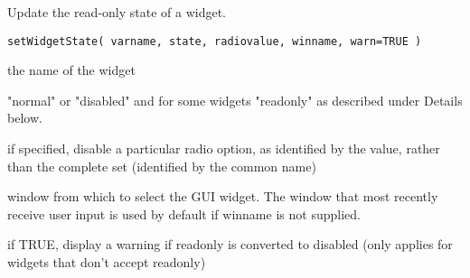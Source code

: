 \documentclass[letterpaper]{book}
\begin{document}
%
\begin{Description}\relax
Update the read-only state of a widget.
\end{Description}
%
\begin{Usage}
\begin{verbatim}
setWidgetState( varname, state, radiovalue, winname, warn=TRUE )
\end{verbatim}
\end{Usage}
%
\begin{Arguments}
\begin{ldescription}
\item[\code{varname}] the name of the widget
\item[\code{state}] "normal" or "disabled" and for some widgets "readonly" as described under Details below.
\item[\code{radiovalue}] if specified, disable a particular radio option, as identified by the value, rather than the complete set (identified by the common name)
\item[\code{winname}] window from which to select the GUI widget. The window that most recently receive user input is used by default if winname is not supplied.
\item[\code{warn}] if TRUE, display a warning if readonly is converted to disabled (only applies for widgets that don't accept readonly)
\end{ldescription}
\end{Arguments}
%
\end{document}
